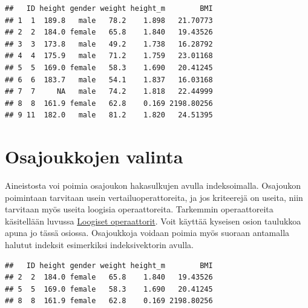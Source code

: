 \documentclass[
]{book}
\newenvironment{Shaded}{\begin{snugshade}}{\end{snugshade}}
\newcommand{\CommentTok}[1]{\textcolor[rgb]{0.56,0.35,0.01}{\textit{#1}}}
\newcommand{\DecValTok}[1]{\textcolor[rgb]{0.00,0.00,0.81}{#1}}
\newcommand{\NormalTok}[1]{#1}
\newcommand{\SpecialCharTok}[1]{\textcolor[rgb]{0.00,0.00,0.00}{#1}}
\newcommand{\StringTok}[1]{\textcolor[rgb]{0.31,0.60,0.02}{#1}}
\begin{document}
\begin{verbatim}
##   ID height gender weight height_m        BMI
## 1  1  189.8   male   78.2    1.898   21.70773
## 2  2  184.0 female   65.8    1.840   19.43526
## 3  3  173.8   male   49.2    1.738   16.28792
## 4  4  175.9   male   71.2    1.759   23.01168
## 5  5  169.0 female   58.3    1.690   20.41245
## 6  6  183.7   male   54.1    1.837   16.03168
## 7  7     NA   male   74.2    1.818   22.44999
## 8  8  161.9 female   62.8    0.169 2198.80256
## 9 11  182.0   male   81.2    1.820   24.51395
\end{verbatim}

\hypertarget{osajoukkojen-valinta}{%
\section{Osajoukkojen valinta}\label{osajoukkojen-valinta}}

Aineistosta voi poimia osajoukon hakasulkujen avulla indeksoimalla. Osajoukon poimintaan tarvitaan usein vertailuoperattoreita, ja jos kriteerejä on useita, niin tarvitaan myös useita loogisia operaattoreita. Tarkemmin operaattoreita käsitellään luvussa \protect\hyperlink{loogiset-operaattorit}{Loogiset operaattorit}. Voit käyttää kyseisen osion taulukkoa apuna jo tässä osiossa. Osajoukkoja voidaan poimia myös suoraan antamalla halutut indeksit esimerkiksi indeksivektorin avulla.

\begin{Shaded}
\end{Shaded}

\begin{verbatim}
##   ID height gender weight height_m        BMI
## 2  2  184.0 female   65.8    1.840   19.43526
## 5  5  169.0 female   58.3    1.690   20.41245
## 8  8  161.9 female   62.8    0.169 2198.80256
\end{verbatim}

\begin{Shaded}
\end{Shaded}
\end{document}
